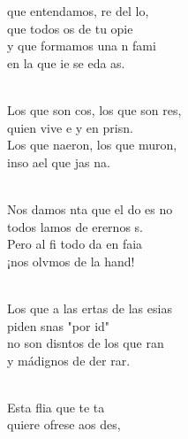 \documentclass[12pt]{article}
\begin{document}
\begin{multicols*}{2}
\begin{cancion}%
	 que entendamos, re del lo,\\
	que todos os de tu opie\\
	y que formamos una n fami\\
	en la que ie se eda as. \\\jump\\
	\begin{chorus}%
	Los que son cos, los que son res,\\
	quien vive e y en prisn. \\
	Los que naeron, los que muron,\\
	inso ael que jas na.  \\
	\end{chorus}%
	\jump\\
	Nos damos nta que el do es no\\
	todos lamos de erernos s.\\
	Pero al fi todo da en faia\\
	¡nos olvmos de la hand!\\\jump\\
	\begin{chorus}%
	Los que a las ertas de las esias\\
	piden snas "por id"\\
	no son disntos de los que ran\\
	y  mádignos de der rar.\\
	\end{chorus}%
	\jump\\
	Esta flia que  te ta\\
	quiere ofrese aos des,\\

\end{cancion}
\end{multicols*}
\end{document}
